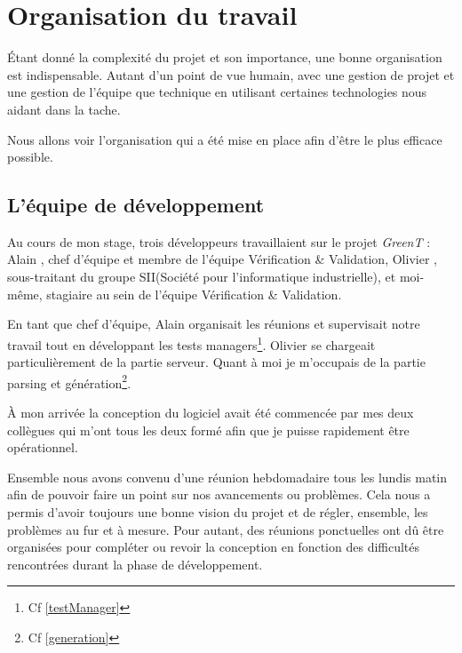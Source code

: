 \chapter{Organisation du travail}\label{chapOrganization}
\begin{figure}
\vspace{-25px}
\begin{minipage}{0.60\textwidth}
\minitoc
\end{minipage}
\end{figure}
\'Etant donné la complexité du projet et son importance, une bonne organisation est indispensable. Autant d'un point de vue humain, avec une gestion de projet et une gestion de l'équipe que technique en utilisant certaines technologies nous aidant dans la tache. 

Nous allons voir l'organisation qui a été mise en place afin d'être le plus efficace possible.
\vspace{-32px}

\section{L'équipe de développement}
Au cours de mon stage, trois développeurs travaillaient sur le projet \textit{GreenT} : Alain , chef d’équipe et membre de l’équipe Vérification \& Validation, Olivier , sous-traitant du groupe SII(Société pour l'informatique industrielle), et moi-même, stagiaire au sein de l’équipe Vérification \& Validation.

En tant que chef d’équipe, Alain  organisait les réunions et supervisait notre travail tout en développant les tests managers\footnote{Cf \ref{testManager}}. Olivier  se chargeait particulièrement de la partie serveur. Quant à moi je m’occupais de la partie parsing et génération\footnote{Cf \ref{generation}}.

À mon arrivée la conception du logiciel avait été commencée par mes deux collègues qui m’ont tous les deux formé afin que je puisse rapidement être opérationnel.

Ensemble nous avons convenu d’une réunion hebdomadaire tous les lundis matin afin de pouvoir faire un point sur nos avancements ou problèmes. Cela nous a permis d’avoir toujours une bonne vision du projet et de régler, ensemble, les problèmes au fur et à mesure. Pour autant, des réunions ponctuelles ont dû être organisées pour compléter ou revoir la conception en fonction des difficultés rencontrées durant la phase de développement.

